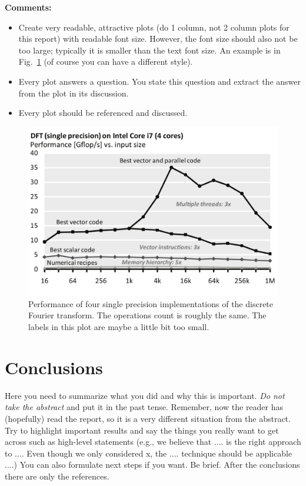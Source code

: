 \documentclass[conference]{IEEEtran}
\begin{document}
{\bf Comments:}
\begin{itemize}
\item Create very readable, attractive plots (do 1 column, not 2 column plots
for this report) with readable font size. However, the font size should also not be too large; typically it is smaller than the text font size.
An example is in Fig.~\ref{fftperf} (of course you can have a different style).
\item Every plot answers a question. You state this question and extract the
answer from the plot in its discussion.
\item Every plot should be referenced and discussed.
\end{itemize}

\begin{figure}\centering
  \includegraphics[scale=0.33]{example-plot}
  \caption{Performance of four single precision implementations of the
  discrete Fourier transform. The operations count is roughly the
  same. The labels in this plot are maybe a little bit too small.\label{fftperf}}
\end{figure}

\section{Conclusions}

Here you need to summarize what you did and why this is
important. {\em Do not take the abstract} and put it in the past
tense. Remember, now the reader has (hopefully) read the report, so it
is a very different situation from the abstract. Try to highlight
important results and say the things you really want to get across
such as high-level statements (e.g., we believe that .... is the right
approach to .... Even though we only considered x, the
.... technique should be applicable ....) You can also formulate next
steps if you want. Be brief. After the conclusions there are only the references.
\end{document}
